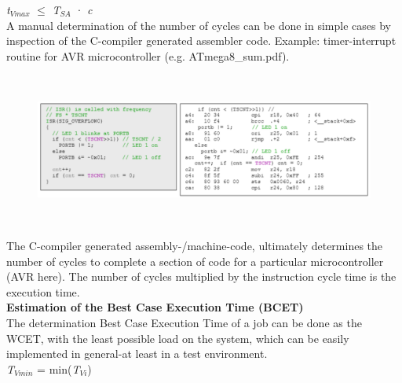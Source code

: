 \textit{t}${}_{Vmax}$ $\mathrm{\le}$ \textit{T${}_{SA}$ }· \textit{c}\\

A manual determination of the number of cycles can be done in simple cases by inspection of the C-compiler generated assembler code. Example: timer-interrupt routine for AVR microcontroller (e.g. ATmega8\_sum.pdf).

	\begin{figure}[h]
    \centering
    \includegraphics[width=17cm, height=5cm]{Images/image78.png}
    \label{fig:Fig 24}
    \end{figure}
 
The C-compiler generated assembly-/machine-code, ultimately determines the number of cycles to complete a section of code for a particular microcontroller (AVR here). The number of cycles multiplied by the instruction cycle time is the execution time.\\

{\rot\bf Estimation of the Best Case Execution Time (BCET)}\\

The determination Best Case Execution Time of a job can be done as the WCET, with the least possible load on the system, which can be easily implemented in general-at least in a test environment.\\

\textit{T${}_{Vmin}$} = min(\textit{T${}_{Vi}$})